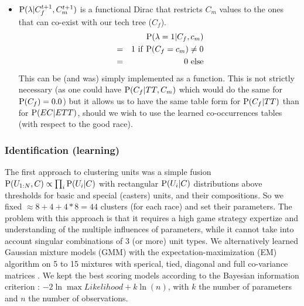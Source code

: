 \begin{itemize}

\item $\mathrm{P}(\lambda | C_f^{t+1},C_m^{t+1})$ is a functional Dirac that restricts $C_m$ values to the ones that can co-exist with our tech tree ($C_f$).
\begin{eqnarray*}
& & \mathrm{P}(\lambda = 1 | C_f, c_m) \\
& = & 1\ \mathrm{if\ } \mathrm{P}(C_f=c_m) \neq 0\\
& = & 0\ \mathrm{else}
\end{eqnarray*}
This can be (and was) simply implemented as a function. This is not strictly necessary (as one could have $\mathrm{P}(C_f|TT,C_m)$ which would do the same for $\mathrm{P}(C_f)=0.0$) but it allows us to have the same table form for $\mathrm{P}(C_f|TT)$ than for $\mathrm{P}(EC|ETT)$, should we wish to use the learned co-occurrences tables (with respect to the good race).

\end{itemize}

\subsubsection{Identification (learning)}
The first approach to clustering units was a simple fusion $\mathrm{P}(U_{1:N},C)\propto \prod_i \mathrm{P}(U_i|C)$ with rectangular $\mathrm{P}(U_i|C)$ distributions above thresholds for basic and special (casters) units, and their compositions. So we fixed $\approx 8+4+4*8 = 44$ clusters (for each race) and set their parameters. The problem with this approach is that it requires a high game strategy expertize and understanding of the multiple influences of parameters, while it cannot take into account singular combinations of 3 (or more) unit types. We alternatively learned Gaussian mixture models (GMM) with the expectation-maximization (EM) algorithm on 5 to 15 mixtures with sperical, tied, diagonal and full co-variance matrices \cite{scikit-learn}. We kept the best scoring models according to the Bayesian information criterion \cite{schwarz1978}: $-2 \ln{\max{Likelihood}} + k \ln(n)$, with $k$ the number of parameters and $n$ the number of observations. %

